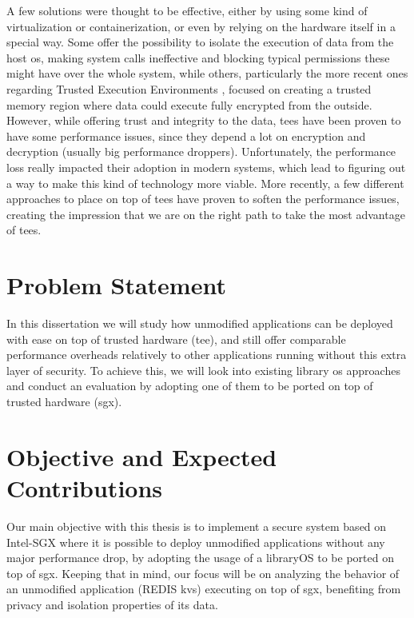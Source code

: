 A few solutions were thought to be effective, either by using some kind of virtualization or containerization, or even by relying on the hardware itself in a special way. 
Some \cite{virtGhostPaper}\cite{flickerPaper}\cite{mushiPaper}\cite{SeCagePaper}\cite{inkTagPaper}\cite{segoPaper} offer the possibility to isolate the execution of data from the host \gls{os}, making system calls ineffective and blocking typical permissions these might have over the whole system, while others, particularly the more recent ones regarding Trusted Execution Environments \cite{armTZPaper}\cite{amdPaper}\cite{sanctumPaper}\cite{intelSGX}, focused on creating a trusted memory region where data could execute fully encrypted from the outside. 
However, while offering trust and integrity to the data, \gls{tee}s have been proven to have some performance issues, since they depend a lot on encryption and decryption (usually big performance droppers). Unfortunately, the performance loss really impacted their adoption in modern systems, which lead to figuring out a way to make this kind of technology more viable. 
More recently, a few different approaches to place on top of \gls{tee}s have proven to soften the performance issues, creating the impression that we are on the right path to take the most advantage of \gls{tee}s. 


\section{Problem Statement}

In this dissertation we will study how unmodified applications can be deployed with ease on top of trusted hardware (\gls{tee}), and still offer comparable performance overheads relatively to other applications running without this extra layer of security. To achieve this, we will look into existing library \gls{os} approaches and conduct an evaluation by adopting one of them to be ported on top of trusted hardware (\gls{sgx}). 




\section{Objective and Expected Contributions} %
\label{sec:objectiveAndContibutions}
Our main objective with this thesis is to implement a secure system based on Intel-SGX
where it is possible to deploy unmodified applications without any major performance
drop, by adopting the usage of a libraryOS to be ported on top of \gls{sgx}. Keeping that in mind, our focus will be on analyzing the behavior of an unmodified application (REDIS \gls{kvs}) executing on top of \gls{sgx}, benefiting from privacy and isolation properties of its data.

